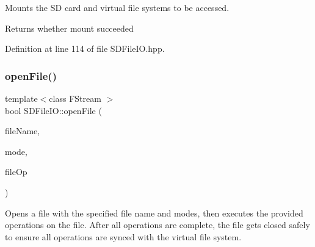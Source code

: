 Mounts the SD card and virtual file systems to be accessed.

\begin{DoxyReturn}{Returns}
whether mount succeeded 
\end{DoxyReturn}


Definition at line 114 of file S\+D\+File\+I\+O.\+hpp.


\begin{DoxyCode}{0}

\end{DoxyCode}
\mbox{\label{classSDFileIO_a09eb67cb5d96201deaaefe38d04f17f3}} 
\subsubsection{\texorpdfstring{openFile()}{openFile()}}
{\footnotesize\ttfamily template$<$class F\+Stream $>$ \\
bool S\+D\+File\+I\+O\+::open\+File (\begin{DoxyParamCaption}\item[{const string \&}]{file\+Name,  }\item[{ios\+\_\+base\+::openmode}]{mode,  }\item[{std\+::function$<$ bool(F\+Stream \&)$>$ \&\&}]{file\+Op }\end{DoxyParamCaption})\hspace{0.3cm}{\ttfamily [inline]}}

Opens a file with the specified file name and modes, then executes the provided operations on the file. After all operations are complete, the file gets closed safely to ensure all operations are synced with the virtual file system.



